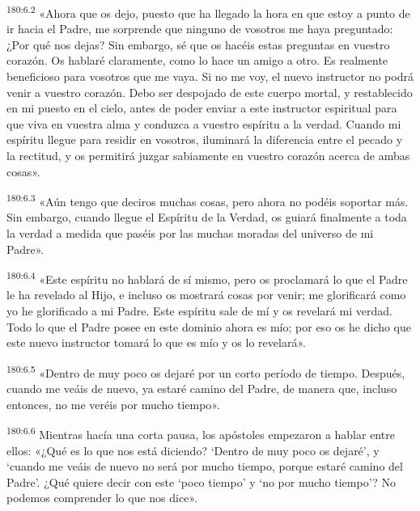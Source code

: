 \par 
\textsuperscript{180:6.2} «Ahora que os dejo, puesto que ha llegado la hora en que estoy a punto de ir hacia el Padre, me sorprende que ninguno de vosotros me haya preguntado: ¿Por qué nos dejas? Sin embargo, sé que os hacéis estas preguntas en vuestro corazón. Os hablaré claramente, como lo hace un amigo a otro. Es realmente beneficioso para vosotros que me vaya. Si no me voy, el nuevo instructor no podrá venir a vuestro corazón. Debo ser despojado de este cuerpo mortal, y restablecido en mi puesto en el cielo, antes de poder enviar a este instructor espiritual para que viva en vuestra alma y conduzca a vuestro espíritu a la verdad. Cuando mi espíritu llegue para residir en vosotros, iluminará la diferencia entre el pecado y la rectitud, y os permitirá juzgar sabiamente en vuestro corazón acerca de ambas cosas».

\par 
\textsuperscript{180:6.3} «Aún tengo que deciros muchas cosas, pero ahora no podéis soportar más. Sin embargo, cuando llegue el Espíritu de la Verdad, os guiará finalmente a toda la verdad a medida que paséis por las muchas moradas del universo de mi Padre».

\par 
\textsuperscript{180:6.4} «Este espíritu no hablará de sí mismo, pero os proclamará lo que el Padre le ha revelado al Hijo, e incluso os mostrará cosas por venir; me glorificará como yo he glorificado a mi Padre. Este espíritu sale de mí y os revelará mi verdad. Todo lo que el Padre posee en este dominio ahora es mío; por eso os he dicho que este nuevo instructor tomará lo que es mío y os lo revelará».

\par 
\textsuperscript{180:6.5} «Dentro de muy poco os dejaré por un corto período de tiempo. Después, cuando me veáis de nuevo, ya estaré camino del Padre, de manera que, incluso entonces, no me veréis por mucho tiempo».

\par 
\textsuperscript{180:6.6} Mientras hacía una corta pausa, los apóstoles empezaron a hablar entre ellos: «¿Qué es lo que nos está diciendo? `Dentro de muy poco os dejaré', y `cuando me veáis de nuevo no será por mucho tiempo, porque estaré camino del Padre'. ¿Qué quiere decir con este `poco tiempo' y `no por mucho tiempo'? No podemos comprender lo que nos dice».

